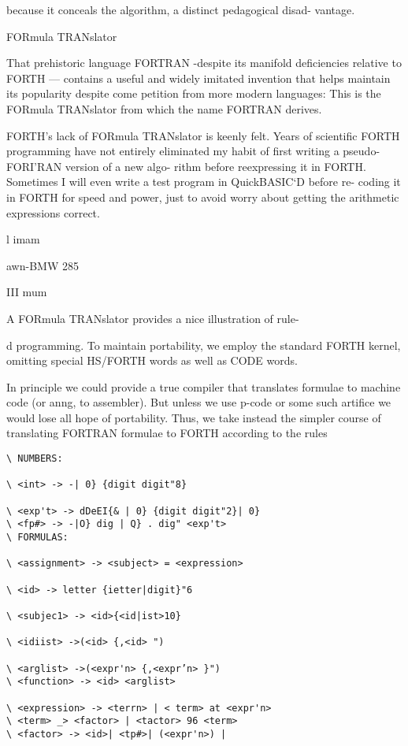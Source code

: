 because it conceals the algorithm, a distinct pedagogical disad-
vantage.

FORmula TRANslator

That prehistoric language FORTRAN -despite its manifold
deficiencies relative to FORTH — contains a useful and widely
imitated invention that helps maintain its popularity despite come
petition from more modern languages: This is the FORmula
TRANslator from which the name FORTRAN derives.

FORTH’s lack of FORmula TRANslator is keenly felt. Years of
scientific FORTH programming have not entirely eliminated my
habit of first writing a pseudo-FORI'RAN version of a new algo-
rithm before reexpressing it in FORTH. Sometimes I will even
write a test program in QuickBASIC‘D before re- coding it in
FORTH for speed and power, just to avoid worry about getting
the arithmetic expressions correct.

l
imam

awn-BMW 285

III mum

A FORmula TRANslator provides a nice illustration of rule-

d programming. To maintain portability, we employ the
standard FORTH kernel, omitting special HS/FORTH words as
well as CODE words.

In principle we could provide a true compiler that translates
formulae to machine code (or anng, to assembler). But unless
we use p-code or some such artifice we would lose all hope of
portability. Thus, we take instead the simpler course of translating
FORTRAN formulae to FORTH according to the rules

\begin{verbatim}
\ NUMBERS:

\ <int> -> -| 0} {digit digit"8}

\ <exp't> -> dDeEI{& | 0} {digit digit"2}| 0}
\ <fp#> -> -|O} dig | Q} . dig" <exp't>
\ FORMULAS:

\ <assignment> -> <subject> = <expression>

\ <id> -> letter {ietter|digit}"6

\ <subjec1> -> <id>{<id|ist>10}

\ <idiist> ->(<id> {,<id> ")

\ <arglist> ->(<expr'n> {,<expr’n> }")
\ <function> -> <id> <arglist>

\ <expression> -> <terrn> | < term> at <expr'n>
\ <term> _> <factor> | <tactor> 96 <term>
\ <factor> -> <id>| <tp#>| (<expr'n>) |
\end{verbatim}

